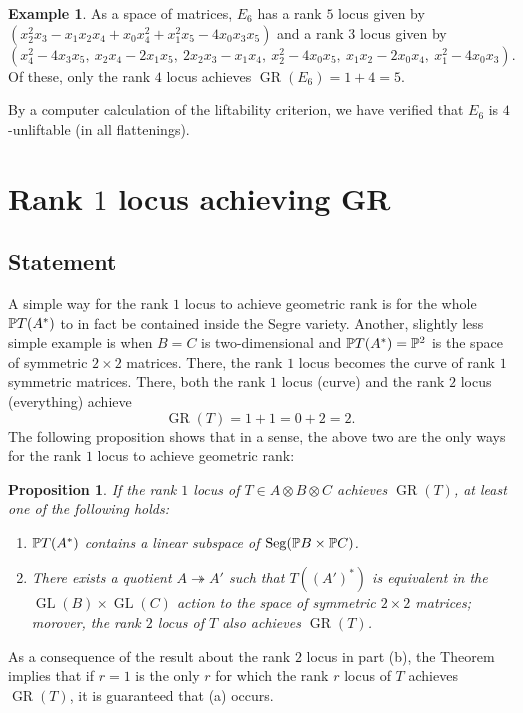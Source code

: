 \documentclass[a4paper,10pt]{article}
\let\surjto\twoheadrightarrow
\DeclareMathOperator{\Seg}{Seg}
\DeclareMathOperator{\GR}{GR}
\DeclareMathOperator{\GL}{GL}
\newtheorem{prop}[theorem]{Proposition}
\theoremstyle{definition}
\newtheorem{example}[theorem]{Example}
\theoremstyle{remark}
\begin{document}
\begin{example}
As a space of matrices, $E_6$ has a rank $5$ locus given by $(x_2^2x_3 - x_1x_2x_4 + x_0x_4^2 + x_1^2x_5 - 4x_0x_3x_5)$ and a rank $3$ locus given by
\[
    (x_4^2 - 4x_3x_5,\ x_2x_4 - 2x_1x_5,\ 2x_2x_3 - x_1x_4,\ x_2^2 - 4x_0x_5,\ x_1x_2 - 2x_0x_4,\ x_1^2 - 4x_0x_3).
\]
Of these, only the rank $4$ locus achieves $\GR(E_6) = 1+4 = 5$.

By a computer calculation of the liftability criterion, we have verified that $E_6$ is $4$-unliftable (in all flattenings).
\end{example}

























\section{Rank $1$ locus achieving GR}
\label{sec:rank-one-degeneracies}

\subsection{Statement}

A simple way for the rank $1$ locus to achieve geometric rank is for the whole $\pe T(A^*)$ to in fact be contained inside the Segre variety. Another, slightly less simple example is when $B=C$ is two-dimensional and $\pe T(A^*)=\pe^2$ is the space of symmetric $2\times2$ matrices. There, the rank $1$ locus becomes the curve of rank $1$ symmetric matrices. There, both the rank $1$ locus (curve) and the rank $2$ locus (everything) achieve
\[
    \GR(T) = 1+1 = 0+2 = 2.
\]
The following proposition shows that in a sense, the above two are the only ways for the rank $1$ locus to achieve geometric rank:

\begin{prop}
    \label{prp:pawel}
    If the rank $1$ locus of $T\in A\otimes B\otimes C$ achieves $\GR(T)$, at least one of the following holds:
    \begin{enumerate}[label={\textup{(\alph*)}}]
        \item $\pe T(A^*)$ contains a linear subspace of $\Seg(\pe B\times\pe C)$.
        \item There exists a quotient $A\surjto A'$ such that $T((A')^*)$ is equivalent in the $\GL(B)\times\GL(C)$ action to the space of symmetric $2\times 2$ matrices; morover, the rank $2$ locus of $T$ also achieves $\GR(T)$.
    \end{enumerate}
\end{prop}
As a consequence of the result about the rank $2$ locus in part (b), the Theorem implies that if $r=1$ is the only $r$ for which the rank $r$ locus of $T$ achieves $\GR(T)$, it is guaranteed that (a) occurs.
\end{document}
